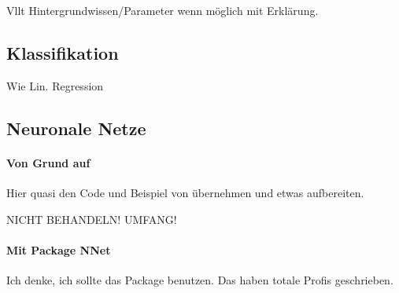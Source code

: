 Vllt Hintergrundwissen/Parameter wenn möglich mit Erklärung. 
\subsection{Klassifikation}
Wie Lin. Regression
\subsection{Neuronale Netze}
\paragraph{Von Grund auf}
Hier quasi den Code und Beispiel von \cite{SelbyNN} übernehmen und etwas aufbereiten.

NICHT BEHANDELN! UMFANG!

\paragraph{Mit Package NNet}
Ich denke, ich sollte das Package benutzen. Das haben totale Profis geschrieben. 